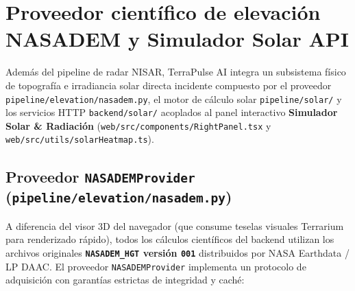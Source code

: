 \documentclass[11pt,a4paper]{article}
\newcommand{\src}[1]{\nolinkurl{#1}}
\begin{document}
\section{Proveedor científico de elevación NASADEM y Simulador Solar API}
\label{sec:arq-nasadem-solar}

Además del pipeline de radar NISAR, TerraPulse AI integra un subsistema físico de topografía e irradiancia solar
directa incidente compuesto por el proveedor \src{pipeline/elevation/nasadem.py}, el motor de cálculo solar
\src{pipeline/solar/} y los servicios HTTP \src{backend/solar/} acoplados al panel interactivo
\textbf{Simulador Solar \& Radiación} (\src{web/src/components/RightPanel.tsx} y \src{web/src/utils/solarHeatmap.ts}).

\subsection{Proveedor \texttt{NASADEMProvider} (\src{pipeline/elevation/nasadem.py})}

A diferencia del visor 3D del navegador (que consume teselas visuales Terrarium para renderizado rápido), todos
los cálculos científicos del backend utilizan los archivos originales \textbf{\texttt{NASADEM\_HGT} versión
\texttt{001}} distribuidos por NASA Earthdata / LP DAAC. El proveedor \texttt{NASADEMProvider} implementa un
protocolo de adquisición con garantías estrictas de integridad y caché:
\end{document}
